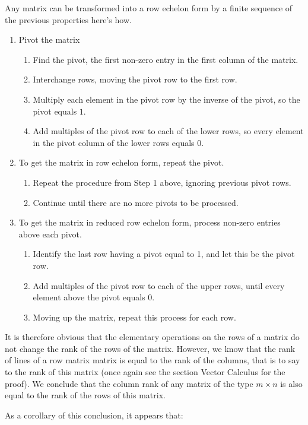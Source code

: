 	Any matrix can be transformed into a row echelon form by a finite sequence of the previous properties here's how.
	\begin{enumerate}
		\item Pivot the matrix
		\begin{enumerate}
			\item Find the pivot, the first non-zero entry in the first column of the matrix.
			\item Interchange rows, moving the pivot row to the first row.
			\item Multiply each element in the pivot row by the inverse of the pivot, so the pivot equals $1$.
			\item Add multiples of the pivot row to each of the lower rows, so every element in the pivot column of the lower rows equals $0$.				
		\end{enumerate}
		\item To get the matrix in row echelon form, repeat the pivot.
		\begin{enumerate}
			\item Repeat the procedure from Step 1 above, ignoring previous pivot rows.
			\item Continue until there are no more pivots to be processed.
		\end{enumerate}
		\item To get the matrix in reduced row echelon form, process non-zero entries above each pivot.
		\begin{enumerate}
			\item Identify the last row having a pivot equal to 1, and let this be the pivot row.
			\item Add multiples of the pivot row to each of the upper rows, until every element above the pivot equals $0$.
			\item Moving up the matrix, repeat this process for each row.
		\end{enumerate}
	\end{enumerate}
	It is therefore obvious that the elementary operations on the rows of a matrix do not change the rank of the rows of the matrix. However, we know that the rank of lines of a row matrix matrix is equal to the rank of the columns, that is to say to the rank of this matrix (once again see the section Vector Calculus for the proof). We conclude that the column rank of any matrix of the type $m\times n$ is also equal to the rank of the rows of this matrix.
	
	As a corollary of this conclusion, it appears that:
	
